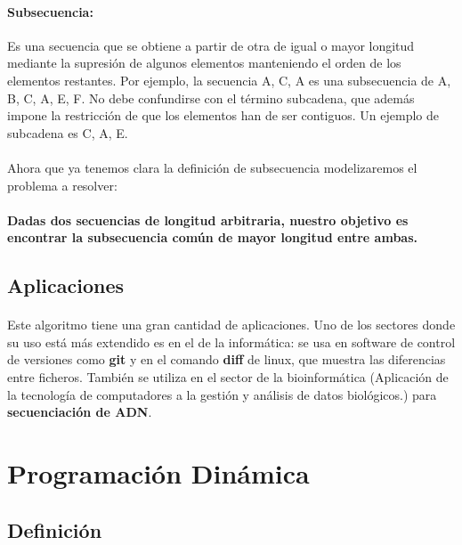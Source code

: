 \documentclass{article}
\begin{document}
		\paragraph{Subsecuencia:}
		Es una secuencia que se obtiene a partir de otra de igual o mayor longitud mediante la supresión de algunos elementos manteniendo el orden de los elementos restantes. Por ejemplo, la secuencia A, C, A es una subsecuencia de A, B, C, A, E, F.
		\newline
		No debe confundirse con el término subcadena, que además impone la restricción de que los elementos han de ser contiguos. Un ejemplo de subcadena es  C, A, E.

		\paragraph{}
		Ahora que ya tenemos clara la definición de subsecuencia modelizaremos el problema a resolver:
		
		\paragraph{}
		\textbf{Dadas dos secuencias de longitud arbitraria, nuestro objetivo es encontrar la subsecuencia común de mayor longitud entre ambas.}

	\subsection{Aplicaciones}
	
		\paragraph{}
		Este algoritmo tiene una gran cantidad de aplicaciones. Uno de los sectores donde su uso está más extendido es en el de la informática: se usa en software de control de versiones como \textbf{git} y en el comando \textbf{diff} de linux, que muestra las diferencias entre ficheros. También se utiliza en el sector de la bioinformática (Aplicación de la tecnología de computadores a la gestión y análisis de datos biológicos.) para \textbf{secuenciación de ADN}.

\section{Programación Dinámica}

	\subsection{Definición}
	
\end{document}
